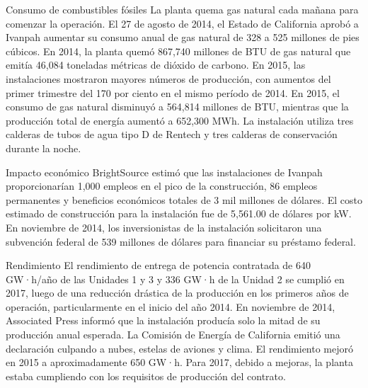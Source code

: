 \documentclass[12pt]{article}
\begin{document}
Consumo de combustibles fósiles
La planta quema gas natural cada mañana para comenzar la operación. El 27 de agosto de 2014, el Estado de California aprobó a Ivanpah aumentar su consumo anual de gas natural de 328 a 525 millones de pies cúbicos. En 2014, la planta quemó 867,740 millones de BTU de gas natural que emitía 46,084 toneladas métricas de dióxido de carbono. En 2015, las instalaciones mostraron mayores números de producción, con aumentos del primer trimestre del 170 por ciento en el mismo período de 2014.
En 2015, el consumo de gas natural disminuyó a 564,814 millones de BTU, mientras que la producción total de energía aumentó a 652,300 MWh.
La instalación utiliza tres calderas de tubos de agua tipo D de Rentech y tres calderas de conservación durante la noche.
 
Impacto económico
BrightSource estimó que las instalaciones de Ivanpah proporcionarían 1,000 empleos en el pico de la construcción, 86 empleos permanentes y beneficios económicos totales de 3 mil millones de dólares.
El costo estimado de construcción para la instalación fue de 5,561.00 de dólares por kW.
En noviembre de 2014, los inversionistas de la instalación solicitaron una subvención federal de 539 millones de dólares para financiar su préstamo federal.
 
Rendimiento
El rendimiento de entrega de potencia contratada de 640 GW·h/año de las Unidades 1 y 3 y 336 GW·h de la Unidad 2 se cumplió en 2017, luego de una reducción drástica de la producción en los primeros años de operación, particularmente en el inicio del año 2014.
En noviembre de 2014, Associated Press informó que la instalación producía solo la mitad de su producción anual esperada. La Comisión de Energía de California emitió una declaración culpando a nubes, estelas de aviones y clima. El rendimiento mejoró en 2015 a aproximadamente 650 GW·h.
Para 2017, debido a mejoras, la planta estaba cumpliendo con los requisitos de producción del contrato.
 
\end{document}
